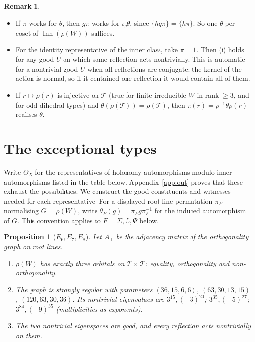 \documentclass[11pt]{amsart}
\newtheorem{proposition}[theorem]{Proposition}
\theoremstyle{definition}
\newtheorem{remark}[theorem]{Remark}
\newcommand{\T}{\mathcal{T}}
\newcommand{\Inn}{\operatorname{Inn}}
\begin{document}
\begin{remark}\label{rem:reduce}
\begin{itemize}
\item If $\pi$ works for $\theta$, then $g\pi$ works for $\iota_g\theta$, since $\{hg\pi\}=\{h\pi\}$. So one
$\theta$ per coset of $\Inn(\rho(W))$ suffices.
\item For the identity representative of the inner class, take $\pi=1$. Then (i) holds for any good $U$ on which some reflection acts nontrivially.
This is automatic for a nontrivial good $U$ when all reflections are conjugate: the kernel of the action is normal,
so if it contained one reflection it would contain all of them.
\item If $r\mapsto\rho(r)$ is injective on $\T$ (true for finite irreducible $W$ in rank $\ge3$, and for odd dihedral types) and
$\theta(\rho(\T))=\rho(\T)$, then $\pi(r)=\rho^{-1}\theta\rho(r)$ realises $\theta$.
\end{itemize}
\end{remark}

\section{The exceptional types}\label{sec:exceptional}

Write $\Theta_X$ for the representatives of holonomy automorphisms modulo inner automorphisms
listed in the table below. Appendix~\ref{app:out} proves that these exhaust the possibilities.
We construct the good constituents and witnesses needed for each representative.
For a displayed root-line permutation $\pi_F$ normalising $G=\rho(W)$, write
$\theta_F(g)=\pi_Fg\pi_F^{-1}$ for the induced automorphism of $G$.
This convention applies to $F=\Sigma,L,\Psi$ below.


\begin{proposition}[$E_6,E_7,E_8$]\label{prop:E}
Let $A_\perp$ be the adjacency matrix of the orthogonality graph on root lines.
\begin{enumerate}[label=(\alph*)]
\item $\rho(W)$ has exactly three orbitals on $\T\times\T$: equality, orthogonality and non-orthogonality.
\item The graph is strongly regular with parameters $(36,15,6,6)$, $(63,30,13,15)$, $(120,63,30,36)$. Its
nontrivial eigenvalues are $3^{15},(-3)^{20}$; $3^{35},(-5)^{27}$; $3^{84},(-9)^{35}$ (multiplicities as
exponents).
\item The two nontrivial eigenspaces are good, and every reflection acts nontrivially on them.
\end{enumerate}
\end{proposition}
\end{document}
